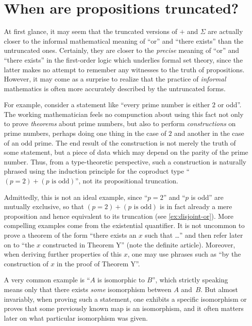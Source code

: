 %


\section{When are propositions truncated?}
\label{subsec:when-trunc}

%
%
%

At first glance, it may seem that the truncated versions of $+$ and $\Sigma$ are actually closer to the informal mathematical meaning of ``or'' and ``there exists'' than the untruncated ones.
Certainly, they are closer to the \emph{precise} meaning of ``or'' and ``there exists'' in the first-order logic  which underlies formal set theory, since the latter makes no attempt to remember any witnesses to the truth of propositions.
However, it may come as a surprise to realize that the practice of \emph{informal} mathematics is often more accurately described by the untruncated forms.

%
For example, consider a statement like ``every prime number is either $2$ or odd''.
The working mathematician feels no compunction about using this fact not only to prove \emph{theorems} about prime numbers, but also to perform \emph{constructions} on prime numbers, perhaps doing one thing in the case of $2$ and another in the case of an odd prime.
The end result of the construction is not merely the truth of some statement, but a piece of data which may depend on the parity of the prime number.
Thus, from a type-theoretic perspective, such a construction is naturally phrased using the induction principle for the coproduct type ``$(p=2)+(p\text{ is odd})$'', not its propositional truncation.

Admittedly, this is not an ideal example, since ``$p=2$'' and ``$p$ is odd'' are mutually exclusive, so that $(p=2)+(p\text{ is odd})$ is in fact already a mere proposition and hence equivalent to its truncation (see \cref{ex:disjoint-or}).
More compelling examples come from the existential quantifier.
It is not uncommon to prove a theorem of the form ``there exists an $x$ such that \dots'' and then refer later on to ``the $x$ constructed in Theorem Y'' (note the definite article).
Moreover, when deriving further properties of this $x$, one may use phrases such as ``by the construction of $x$ in the proof of Theorem Y''.

A very common example is ``$A$ is isomorphic to $B$'', which strictly speaking means only that there exists \emph{some} isomorphism between $A$ and~$B$.
But almost invariably, when proving such a statement, one exhibits a specific isomorphism or proves that some previously known map is an isomorphism, and it often matters later on what particular isomorphism was given.

